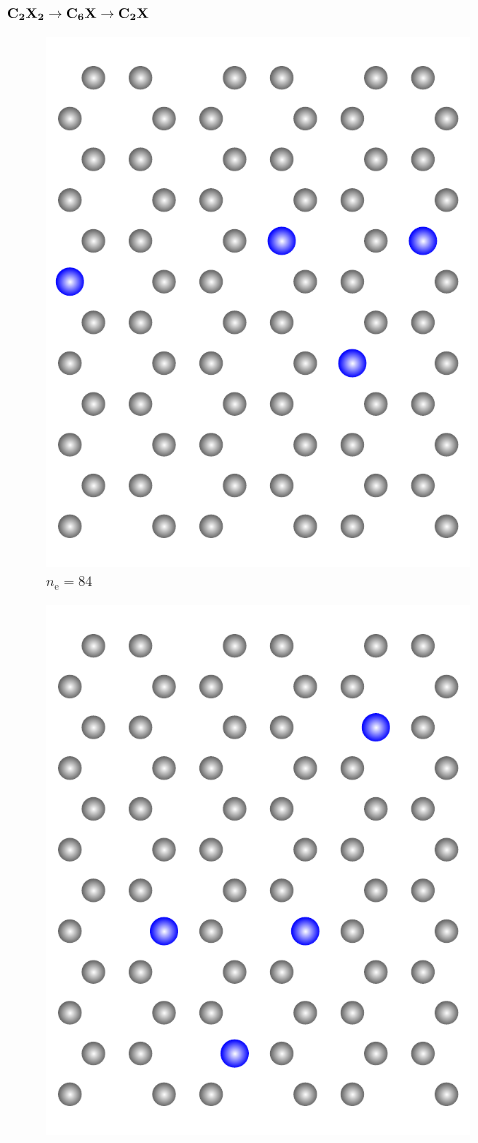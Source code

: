 \documentclass{beamer}
\def \nE {n_\mathrm{e}}
\begin{document}
\begin{frame}{$\bf C_{\boldsymbol 2}X_{\boldsymbol 2} \rightarrow C_{\boldsymbol 6}X \rightarrow C_{\boldsymbol 2}X$}
\begin{figure}
\begin{minipage}[b]{0.19\textwidth}
				\includegraphics[height=1.1\textwidth]{Abbildungen/ne84.pdf} \\
				$\nE = 84$
			\end{minipage}
			\hfill
			\begin{minipage}[b]{0.19\textwidth}
				\centering
				\includegraphics[height=1.1\textwidth]{Abbildungen/ne106.pdf} \\

\end{minipage}
\end{figure}
\end{frame}
\end{document}
